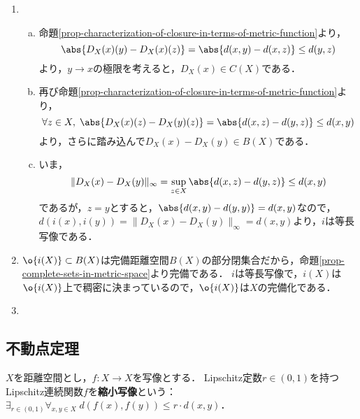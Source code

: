 \documentclass[uplatex,dvipdfmx]{jsreport}
\begin{document}
\begin{Proof}\mbox{}
    \begin{enumerate}
        \item \begin{enumerate}[(a)]
            \item 命題\ref{prop-characterization-of-closure-in-terms-of-metric-function}より，
            \[\abs{D_X(x)(y)-D_X(x)(z)}=\abs{d(x,y)-d(x,z)}\le d(y,z)\]
            より，$y\to x$の極限を考えると，$D_X(x)\in C(X)$である．
            \item 再び命題\ref{prop-characterization-of-closure-in-terms-of-metric-function}より，
            \[\forall z\in X,\;\abs{D_X(x)(z)-D_X(y)(z)}=\abs{d(x,z)-d(y,z)}\le d(x,y)\]
            より，さらに踏み込んで$D_X(x)-D_X(y)\in B(X)$である．
            \item 
            いま，
            \[\|D_X(x)-D_X(y)\|_\infty=\sup_{z\in X}\abs{d(x,z)-d(y,z)}\le d(x,y)\]
            であるが，$z=y$とすると，$\abs{d(x,y)-d(y,y)}=d(x,y)$なので，$d(i(x),i(y))=\|D_X(x)-D_X(y)\|_\infty=d(x,y)$より，$i$は等長写像である．
        \end{enumerate}
        \item 
        $\o{i(X)}\subset B(X)$は完備距離空間$B(X)$の部分閉集合だから，命題\ref{prop-complete-sets-in-metric-space}より完備である．
        $i$は等長写像で，$i(X)$は$\o{i(X)}$上で稠密に決まっているので，$\o{i(X)}$は$X$の完備化である．
        \item 

    \end{enumerate}
\end{Proof}

\subsection{不動点定理}

\begin{definition}
    $X$を距離空間とし，$f:X\to X$を写像とする．
    Lipschitz定数$r\in(0,1)$を持つLipschitz連続関数$f$を\textbf{縮小写像}という：$\exists_{r\in(0,1)}\forall_{x,y\in X}\;d(f(x),f(y))\le r\cdot d(x,y)$．
\end{definition}
\end{document}
